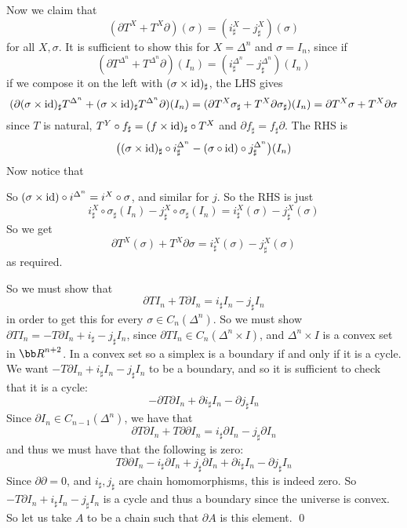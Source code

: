 Now we claim that
$$ (\partial T^X + T^X\partial)(\sigma) = (i^X_\sharp - j^X_\sharp)(\sigma) $$
for all $X,\sigma$.
It is sufficient to show this for $X=\Delta^n$ and $\sigma=I_n$, since if
$$ (\partial T^{\Delta^n} + T^{\Delta^n}\partial)(I_n) = (i^{\Delta^n}_\sharp - j^{\Delta^n}_\sharp)(I_n) $$
if we compose it on the left with $(\sigma\times{\rm id})_\sharp$, the LHS gives
$$ (\partial(\sigma\times{\rm id})_\sharp T^{\Delta^n} + (\sigma\times{\rm id})_\sharp T^{\Delta^n}\partial)(I_n) = (\partial T^X\sigma_\sharp + T^X\partial\sigma_\sharp)(I_n)
= \partial T^X\sigma + T^X\partial\sigma $$
since $T$ is natural, $T^Y\circ f_\sharp=(f\times{\rm id})_\sharp\circ T^X$ and $\partial f_\sharp=f_\sharp\partial$.
The RHS is
$$ \bigl((\sigma\times{\rm id})_\sharp\circ i^{\Delta^n}_\sharp - (\sigma\circ{\rm id})\circ j_\sharp^{\Delta^n}\bigr)(I_n) $$
Now notice that

\centerline{
}

So $(\sigma\times{\rm id})\circ i^{\Delta^n}=i^X\circ\sigma$, and similar for $j$.
So the RHS is just
$$ i^X_\sharp\circ\sigma_\sharp(I_n) - j^X_\sharp\circ\sigma_\sharp(I_n) = i^X_\sharp(\sigma) - j^X_\sharp(\sigma) $$
So we get
$$ \partial T^X(\sigma) + T^X\partial\sigma = i^X_\sharp(\sigma) - j^X_\sharp(\sigma) $$
as required.

So we must show that
$$ \partial TI_n + T\partial I_n = i_\sharp I_n - j_\sharp I_n $$
in order to get this for every $\sigma\in C_n(\Delta^n)$.
So we must show $\partial TI_n=-T\partial I_n+i_\sharp-j_\sharp I_n$, since $\partial TI_n\in C_n(\Delta^n\times I)$, and $\Delta^n\times I$ is a convex set in ${\bb R}^{n+2}$.
In a convex set so a simplex is a boundary if and only if it is a cycle.
We want $-T\partial I_n+i_\sharp I_n-j_\sharp I_n$ to be a boundary, and so it is sufficient to check that it is a cycle:
$$ -\partial T\partial I_n + \partial i_\sharp I_n - \partial j_\sharp I_n $$
Since $\partial I_n\in C_{n-1}(\Delta^n)$, we have that
$$ \partial T\partial I_n + T\partial\partial I_n = i_\sharp\partial I_n - j_\sharp\partial I_n $$
and thus we must have that the following is zero:
$$ T\partial\partial I_n - i_\sharp\partial I_n + j_\sharp\partial I_n + \partial i_\sharp I_n - \partial j_\sharp I_n $$
Since $\partial\partial=0$, and $i_\sharp,j_\sharp$ are chain homomorphisms, this is indeed zero.
So $-T\partial I_n+i_\sharp I_n-j_\sharp I_n$ is a cycle and thus a boundary since the universe is convex.
So let us take $A$ to be a chain such that $\partial A$ is this element.
\qed

